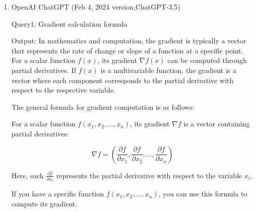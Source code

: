 \begin{enumerate}
\item OpenAI ChatGPT (Feb 4, 2024 version,ChatGPT-3.5)

Query1: Gradient calculation formula

Output: In mathematics and computation, the gradient is typically a vector that represents the rate of change or slope of a function at a specific point. For a scalar function \(f(x)\), its gradient \(\nabla f(x)\) can be computed through partial derivatives. If \(f(x)\) is a multivariable function, the gradient is a vector where each component corresponds to the partial derivative with respect to the respective variable.

The general formula for gradient computation is as follows:

For a scalar function \(f(x_1, x_2, ..., x_n)\), its gradient \(\nabla f\) is a vector containing partial derivatives:

\[ \nabla f = \left( \frac{\partial f}{\partial x_1}, \frac{\partial f}{\partial x_2}, ..., \frac{\partial f}{\partial x_n} \right) \]

Here, each \(\frac{\partial f}{\partial x_i}\) represents the partial derivative with respect to the variable \(x_i\).

If you have a specific function \(f(x_1, x_2, ..., x_n)\), you can use this formula to compute its gradient.

\end{enumerate}

\thispagestyle{nopagenum}